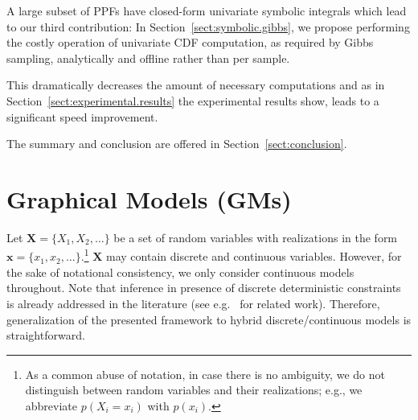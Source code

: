 \documentclass{article}
\renewcommand{\vec}[1]{\mathbf{#1}}
\newcommand{\pr}{p}
\begin{document}

A large subset of PPFs have closed-form univariate symbolic integrals which lead to our third contribution:
In Section~\ref{sect:symbolic.gibbs}, we propose performing the costly operation of univariate CDF computation, as required by Gibbs sampling, analytically and offline rather than per sample.     

This dramatically decreases the amount of necessary computations and as in Section~\ref{sect:experimental.results} the experimental results show, leads to a significant speed improvement. 

The summary and conclusion are offered in Section~\ref{sect:conclusion}. 


\section{Graphical Models (GMs)}
\label{sect:background}
Let $\vec{X} = \{X_1, X_2, \ldots\}$ be a set of random variables with realizations in the form 
$\vec{x} = \{x_1, x_2, \ldots\}$.\footnote{
As a common abuse of notation, in case there is no ambiguity, we do not distinguish between random variables and their realizations; e.g., we abbreviate $\pr(X_i = x_i)$ with $\pr(x_i)$.}
$\vec{X}$ may contain discrete and continuous variables. 
However, for the sake of notational consistency, %
we only consider continuous models throughout. 
Note that inference in presence of discrete deterministic constraints is already addressed in the literature 
(see e.g.\ \cite{li2013dynamic} for related work).
Therefore, generalization of the presented framework to hybrid discrete/continuous models is straightforward.   
\end{document}
